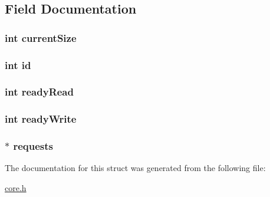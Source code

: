 \subsection{Field Documentation}
\hypertarget{struct_buffer_a0c2f9a0a6941e32677f17cadd8626c6f}{
\subsubsection[{current\-Size}]{\setlength{\rightskip}{0pt plus 5cm}int current\-Size}}\label{struct_buffer_a0c2f9a0a6941e32677f17cadd8626c6f}
\hypertarget{struct_buffer_a7441ef0865bcb3db9b8064dd7375c1ea}{
\subsubsection[{id}]{\setlength{\rightskip}{0pt plus 5cm}int id}}\label{struct_buffer_a7441ef0865bcb3db9b8064dd7375c1ea}
\hypertarget{struct_buffer_a637e49c90b3423cfb2f0b99fecc1b4c3}{
\subsubsection[{ready\-Read}]{\setlength{\rightskip}{0pt plus 5cm}int ready\-Read}}\label{struct_buffer_a637e49c90b3423cfb2f0b99fecc1b4c3}
\hypertarget{struct_buffer_aef94d326fece379f1cc2bfdbc297f448}{
\subsubsection[{ready\-Write}]{\setlength{\rightskip}{0pt plus 5cm}int ready\-Write}}\label{struct_buffer_aef94d326fece379f1cc2bfdbc297f448}
\hypertarget{struct_buffer_a9eaf7c28985896889d16ff7e5b43da32}{
\subsubsection[{requests}]{$\ast$ requests}}\label{struct_buffer_a9eaf7c28985896889d16ff7e5b43da32}


The documentation for this struct was generated from the following file\-:\begin{DoxyCompactItemize}
\item 
\hyperlink{core_8h}{core.\-h}\end{DoxyCompactItemize}
